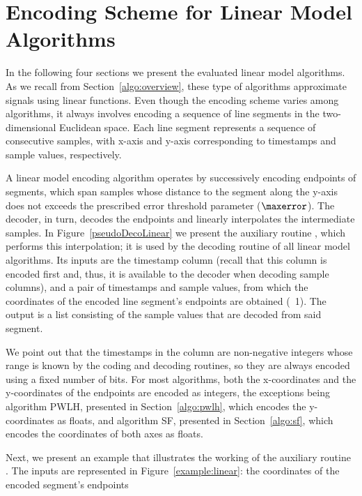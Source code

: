 
\section{Encoding Scheme for Linear Model Algorithms}
\label{algo:decolinear}


In the following four sections we present the evaluated linear model algorithms. As we recall from Section~\ref{algo:overview}, these type of algorithms approximate signals using linear functions. Even though the encoding scheme varies among algorithms, it always involves encoding a sequence of line segments in the two-dimensional Euclidean space. Each line segment represents a sequence of consecutive samples, with x-axis and y-axis corresponding to timestamps and sample values, respectively.


A linear model encoding algorithm operates by successively encoding endpoints of segments, which span samples whose distance to the segment along the y-axis does not exceeds the prescribed error threshold parameter ($\maxerror$). The decoder, in turn, decodes the endpoints and linearly interpolates the intermediate samples. In Figure~\ref{pseudoDecoLinear} we present the auxiliary routine \decodeSegment, which performs this interpolation; it is used by the decoding routine of all linear model algorithms. Its inputs are the timestamp column (recall that this column is encoded first and, thus, it is available to the decoder when decoding sample columns), and a pair of timestamps and sample values, from which the coordinates of the encoded line segment's endpoints are obtained (\Line~1). The output is a list consisting of the sample values that are decoded from said segment.





\clearpage


We point out that the timestamps in the column are non-negative integers whose range is known by the coding and decoding routines, so they are always encoded using a fixed number of bits. For most algorithms, both the x-coordinates and the y-coordinates of the endpoints are encoded as integers, the exceptions being algorithm PWLH, presented in Section~\ref{algo:pwlh}, which encodes the y-coordinates as floats, and algorithm SF, presented in Section~\ref{algo:sf}, which encodes the coordinates of both axes as floats.


Next, we present an example that illustrates the working of the auxiliary routine \decodeSegment. The inputs are represented in Figure~\ref{example:linear}: the coordinates of the encoded segment's endpoints

